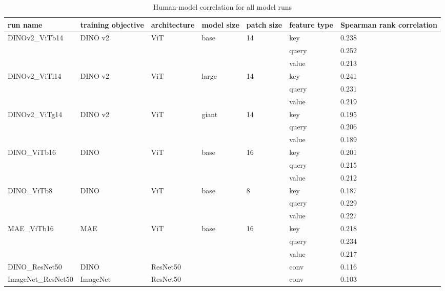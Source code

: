 \documentclass{article}
\begin{document}



\begin{table}[h]
\caption{Human-model correlation for all model runs}
\label{tab:all_runs_corr}
    \centering
\def\arraystretch{2}
\begin{tabular}{|p{3cm}||p{1.4cm}|p{1.7cm}|p{}|p{1cm}|p{1cm}|p{1.5cm}| }
 \hline
  run name & training objective  & architecture & model size & patch size & feature type & Spearman rank    correlation \\
 \hline
 DINOv2\_ViTb14 & DINO v2& ViT & base & 14 & key & 0.238\\
  & & &  &  & query & 0.252\\
  & & &  &  & value & 0.213\\
 \hline
 DINOv2\_ViTl14 & DINO v2& ViT & large & 14 & key & 0.241\\
  & & &  &  & query & 0.231\\
  & & &  &  & value &0.219\\
 \hline
 DINOv2\_ViTg14 & DINO v2& ViT & giant & 14 & key & 0.195\\
  & & &  &  & query & 0.206\\
  & & &  &  & value & 0.189\\
 \hline
 DINO\_ViTb16 & DINO & ViT & base & 16 & key & 0.201\\
  & & &  &  & query & 0.215\\
  & & &  &  & value & 0.212\\
 \hline
 DINO\_ViTb8 & DINO & ViT & base & 8 & key & 0.187\\
  & & &  &  & query & 0.229\\
  & & &  &  & value & 0.227\\
 \hline
 MAE\_ViTb16 & MAE & ViT & base & 16 & key & 0.218\\
  & & &  &  & query & 0.234\\
  & & &  &  & value &0.217\\
 \hline
 DINO\_ResNet50 & DINO & ResNet50 & & & conv & 0.116\\
 \hline
 ImageNet\_ResNet50 & ImageNet & ResNet50 &  &  & conv & 0.103\\
 \hline
\end{tabular}
    \centering
\end{table}
\vspace*{2mm}
\end{document}
